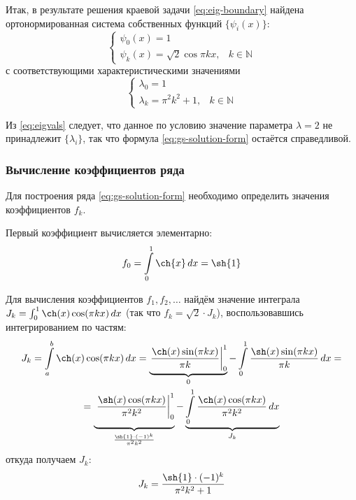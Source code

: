 \documentclass{article}
\numberwithin{equation}{section}
\newcommand{\intl}{\int\limits}
\providecommand{\intat}[3]{\left. {#1}\right\vert^{#2}_{#3}}
\providecommand{\set}[1]{\mathbb{#1}}
\begin{document}
Итак, в результате решения краевой задачи \eqref{eq:eig-boundary}
найдена ортонормированная система собственных функций $\{\psi_i(x)\}$:
\begin{equation}
  \label{eq:eigfuns}
  \begin{cases}
    \psi_0(x) = 1 \\
    \psi_k(x) = \sqrt{2} \cos{\pi k x}, & k \in \set{N}
  \end{cases}
\end{equation}
с соответствующими характеристическими значениями
\begin{equation}
  \label{eq:eigvals}
  \begin{cases}
    \lambda_0 = 1 \\
    \lambda_k = \pi^2 k^2 + 1, & k \in \set{N}
  \end{cases}
\end{equation}

Из \eqref{eq:eigvals} следует, что данное по условию значение
параметра $\lambda = 2$ не принадлежит $\{\lambda_i\}$, так что
формула \eqref{eq:gs-solution-form} остаётся справедливой.

\subsubsection{Вычисление коэффициентов ряда}

Для построения ряда \eqref{eq:gs-solution-form} необходимо определить
значения коэффициентов $f_k$.

Первый коэффициент вычисляется элементарно:
\begin{equation}
  f_0 = \intl_0^1 \ch{x} \,dx = \sh{1}
\end{equation}

Для вычисления коэффициентов $f_1, f_2, \dotsc$ найдём значение
интеграла $J_k = \int_0^1{\ch(x) \cos(\pi k x)\,dx}$ (так что $f_k =
\sqrt{2}\cdot J_k$), воспользовавшись интегрированием по частям:
\begin{multline*}
  J_k = \intl_a^b{\ch(x) \cos(\pi k x)\,dx} =
  \underbrace{\intat{\frac{\ch(x)\sin(\pi k x)}{\pi k}}{1}{0}}_0 -
  \intl_0^1\frac{\sh(x) \sin(\pi k x)}{\pi k} \,dx = \\ =
  \underbrace{\vphantom{\intl_0^1}\intat{\frac{\sh(x)\cos(\pi k
        x)}{\pi^2 k^2}}{1}{0}}_{\frac{\sh{1}\cdot (-1)^k}{\pi^2 k^2}}
  - \underbrace{\intl_0^1{\frac{\ch(x) \cos(\pi k x)}{\pi^2
        k^2}\,dx}}_{J_k}
\end{multline*}
откуда получаем $J_k$:
\begin{gather*}
  J_k = \frac{\sh{1}\cdot (-1)^k}{\pi^2 k^2 + 1}
\end{gather*}
\end{document}
